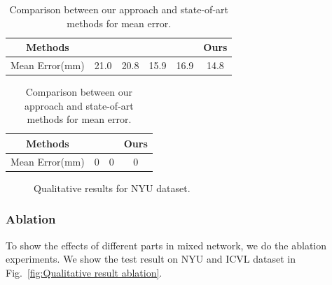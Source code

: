 \documentclass[journal,comsoc]{IEEEtran}
\let\MYoriglatexcaption\caption
\renewcommand{\caption}[2][\relax]{\MYoriglatexcaption[#2]{#2}}
\begin{document}
\begin{table}[htbp]\footnotesize
\centering
    \begin{tabular}{|c|c|c|c|c|c|}
    \hline
    Methods        &\cite{tompson2014real} &\cite{oberweger2015hands} &\cite{oberweger2015training} &\cite{zhou2016model} &Ours\\
    \hline
    Mean Error(mm) &21.0                   &20.8                      &15.9                         &16.9                 &14.8\\
    \hline
\end{tabular}
\vspace{1em}
\caption{Comparison between our approach and state-of-art methods for mean error.}
\label{tab:mean error NYU}
\end{table}

\begin{table}[htbp]\footnotesize
\centering
    \begin{tabular}{|c|c|c|c|}
    \hline
    Methods        &\cite{oberweger2015hands} &\cite{zhou2016model} &Ours\\
    \hline
    Mean Error(mm) &0                      &0                       &0\\
    \hline
    \end{tabular}
\vspace{1em}
\caption{Comparison between our approach and state-of-art methods for mean error.}
\label{tab:mean error ICVL}
\end{table}

\begin{figure}[t]\footnotesize
\centering
    \caption{Qualitative results for NYU dataset.}
    \label{fig:Qualitative result NYU}
\end{figure}
\subsubsection{Ablation}\label{sec:ablation}
To show the effects of different parts in mixed network, we do the ablation experiments. We 
show the test result on NYU and ICVL dataset in Fig.~\ref{fig:Qualitative result ablation}.
\end{document}

